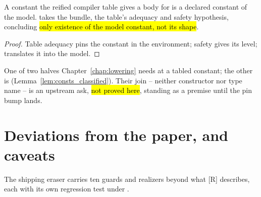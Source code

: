 \begin{lemma}
\label{lem:constants_of_tabled}
\leanok
{} A constant the reified compiler table gives a body for is a declared constant of
the model.
 takes the bundle, the table's adequacy and safety hypothesis, concluding \hl{only
existence of the model constant, not its shape}.
\end{lemma}
\begin{proof}
\leanok
{}
 Table adequacy pins the constant in the environment; safety gives its level;
 translates it into the model.
\end{proof}

\begin{remark}
 One of two halves Chapter~\ref{chap:lowering} needs at a tabled constant; the other
is  (Lemma~\ref{lem:consts_classified}). Their join -- neither
constructor nor type name -- is an upstream ask, \hl{not proved here}, standing as a premise until
the pin bump lands.
\end{remark}

\section{Deviations from the paper, and caveats}
\label{sec:eraser:caveats}

The shipping eraser carries ten guards and realizers beyond what [R] describes, each with
its own regression test under .

